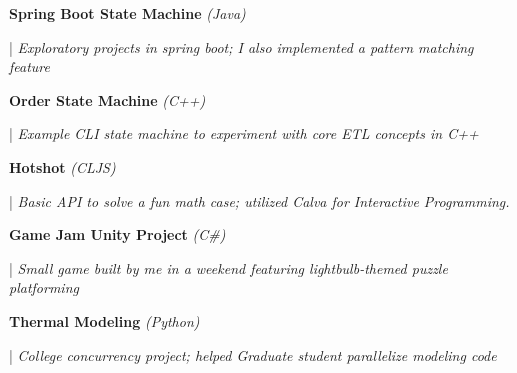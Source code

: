 \documentclass[letterpaper,11pt]{article}
\begin{document}
\begin{minipage}[t]{0.28\textwidth}
	\raggedright
	\textbf{ Spring Boot State Machine }\textit{(Java)} \\
\end{minipage}
\hfill
\begin{minipage}[t]{0.70\textwidth}
	\raggedright
	|\textit{ Exploratory projects in spring boot; I also implemented a pattern matching feature } \\
\end{minipage}

\begin{minipage}[t]{0.28\textwidth}
	\raggedright
	\textbf{ Order State Machine }\textit{(C++)}\\
\end{minipage}
\hfill
\begin{minipage}[t]{0.70\textwidth}
	\raggedright
	|\textit{ Example CLI state machine to experiment with core ETL concepts in C++ } \\
\end{minipage}

\begin{minipage}[t]{0.28\textwidth}
	\raggedright
	\textbf{ Hotshot }\textit{(CLJS)}\\
\end{minipage}
\hfill
\begin{minipage}[t]{0.70\textwidth}
	\raggedright
	|\textit{ Basic API to solve a fun math case; utilized Calva for Interactive Programming.  } \\
\end{minipage}

\begin{minipage}[t]{0.28\textwidth}
	\raggedright
	\textbf{ Game Jam Unity Project }\textit{(C\#)} \\
\end{minipage}
\hfill
\begin{minipage}[t]{0.70\textwidth}
	\raggedright
	|\textit{ Small game built by me in a weekend featuring lightbulb-themed puzzle platforming} \\
\end{minipage}

\begin{minipage}[t]{0.28\textwidth}
	\raggedright
	\textbf{ Thermal Modeling }\textit{(Python)}\\
\end{minipage}
\hfill
\begin{minipage}[t]{0.70\textwidth}
	\raggedright
	|\textit{ College concurrency project; helped Graduate student parallelize modeling code } \\
\end{minipage}
\end{document}
